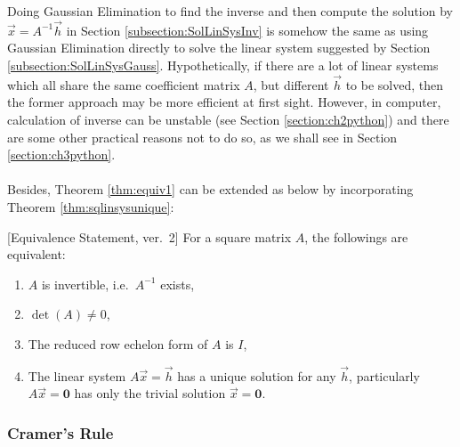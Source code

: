 Doing Gaussian Elimination to find the inverse and then compute the solution by $\vec{x} = A^{-1}\vec{h}$ in Section \ref{subsection:SolLinSysInv} is somehow the same as using Gaussian Elimination directly to solve the linear system suggested by Section \ref{subsection:SolLinSysGauss}. Hypothetically, if there are a lot of linear systems which all share the same coefficient matrix $A$, but different $\vec{h}$ to be solved, then the former approach may be more efficient at first sight. However, in computer, calculation of inverse can be unstable (see Section \ref{section:ch2python}) and there are some other practical reasons not to do so, as we shall see in Section \ref{section:ch3python}. \\
\\
Besides, Theorem \ref{thm:equiv1} can be extended as below by incorporating Theorem \ref{thm:sqlinsysunique}:
\begin{thm}
\label{thm:equiv2}[Equivalence Statement, ver.\ 2]
For a square matrix $A$, the followings are equivalent:
\begin{enumerate}[label=(\alph*)]
\item $A$ is invertible, i.e.\ $A^{-1}$ exists,
\item $\det(A) \neq 0$,
\item The reduced row echelon form of $A$ is $I$,
\item The linear system $A\vec{x} = \vec{h}$ has a unique solution for any $\vec{h}$, particularly $A\vec{x} = \textbf{0}$ has only the trivial solution $\vec{x} = \textbf{0}$.
\end{enumerate}
\end{thm}

\subsubsection{Cramer's Rule}

